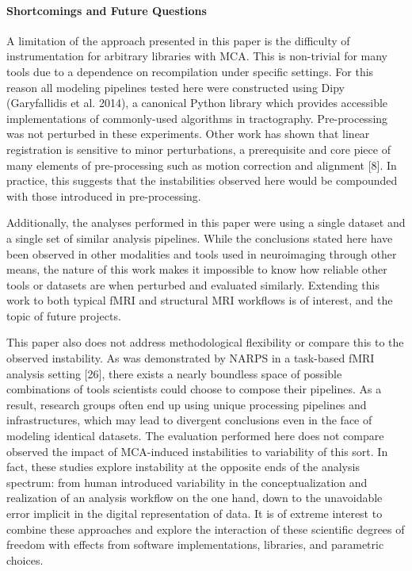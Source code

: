 \documentclass[fleqn,10pt]{SelfArx} %
\begin{document}
\paragraph{Shortcomings and Future Questions}
A limitation of the approach presented in this paper is the difficulty of instrumentation for arbitrary libraries with
MCA. This is non-trivial for many tools due to a dependence on recompilation under specific settings. For this reason
all modeling pipelines tested here were constructed using Dipy (Garyfallidis et al. 2014), a canonical Python library
which provides accessible implementations of commonly-used algorithms in tractography. Pre-processing was not perturbed
in these experiments. Other work has shown that linear registration is sensitive to minor perturbations, a prerequisite
and core piece of many elements of pre-processing such as motion correction and alignment [8]. In practice, this
suggests that the instabilities observed here would be compounded with those introduced in pre-processing.

Additionally, the analyses performed in this paper were using a single dataset and a single set of similar analysis
pipelines. While the conclusions stated here have been observed in other modalities and tools used in neuroimaging
through other means, the nature of this work makes it impossible to know how reliable other tools or datasets are when
perturbed and evaluated similarly. Extending this work to both typical fMRI and structural MRI workflows is of
interest, and the topic of future projects.

This paper also does not address methodological flexibility or compare this to the observed instability. As was
demonstrated by NARPS in a task-based fMRI analysis setting [26], there exists a nearly boundless space of possible
combinations of tools scientists could choose to compose their pipelines. As a result, research groups often end up
using unique processing pipelines and infrastructures, which may lead to divergent conclusions even in the face of
modeling identical datasets. The evaluation performed here does not compare observed the impact of MCA-induced
instabilities to variability of this sort. In fact, these studies explore instability at the opposite ends of the
analysis spectrum: from human introduced variability in the conceptualization and realization of an analysis workflow
on the one hand, down to the unavoidable error implicit in the digital representation of data. It is of extreme
interest to combine these approaches and explore the interaction of these scientific degrees of freedom with effects
from software implementations, libraries, and parametric choices.
\end{document}
